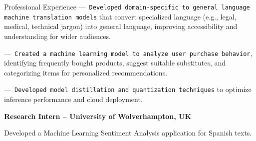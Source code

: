 \begin{rubric}{Professional Experience}
---~\texttt{Developed domain-specific to general language machine translation models} that convert specialized language (e.g., legal, medical, technical jargon) into general language, improving accessibility and understanding for wider audiences.\par

---~\texttt{Created a machine learning model to analyze user purchase behavior}, identifying frequently bought products, suggest suitable substitutes, and categorizing items for personalized recommendations.\par
---~\texttt{Developed model distillation and quantization techniques} to optimize inference performance and cloud deployment.

%
%
\entry*[02.2017 -- 08.2017]%
	\textbf{Research Intern -- University of Wolverhampton, UK}
 
 Developed a Machine Learning Sentiment Analysis application for Spanish texts.
%
\end{rubric}